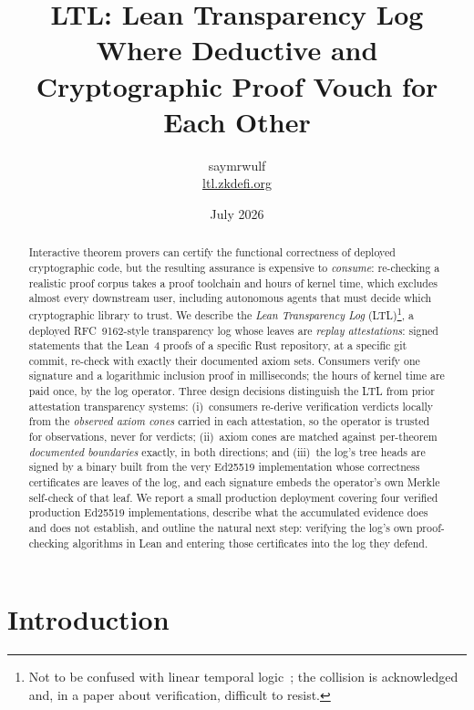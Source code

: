 \documentclass[10pt,twocolumn]{article}
\title{\textbf{LTL: Lean Transparency Log}\\[2pt]
\large Where Deductive and Cryptographic Proof Vouch for Each Other}
\author{saymrwulf\\ \small \url{ltl.zkdefi.org}}
\date{July 2026}
\begin{document}
\maketitle

\begin{abstract}
Interactive theorem provers can certify the functional correctness of
deployed cryptographic code, but the resulting assurance is expensive to
\emph{consume}: re-checking a realistic proof corpus takes a proof
toolchain and hours of kernel time, which excludes almost every
downstream user, including autonomous agents that must decide which
cryptographic library to trust. We describe the \emph{Lean Transparency
Log} (LTL)\footnote{Not to be confused with linear temporal
logic~\cite{pnueli77}; the collision is acknowledged and, in a paper
about verification, difficult to resist.}, a deployed RFC~9162-style
transparency log whose leaves are \emph{replay attestations}: signed
statements that the Lean~4 proofs of a specific Rust repository, at a
specific git commit, re-check with exactly their documented axiom sets.
Consumers verify one signature and a logarithmic inclusion proof in
milliseconds; the hours of kernel time are paid once, by the log
operator. Three design decisions distinguish the LTL from prior
attestation transparency systems: (i)~consumers re-derive verification
verdicts locally from the \emph{observed axiom cones} carried in each
attestation, so the operator is trusted for observations, never for
verdicts; (ii)~axiom cones are matched against per-theorem
\emph{documented boundaries} exactly, in both directions; and (iii)~the
log's tree heads are signed by a binary built from the very Ed25519
implementation whose correctness certificates are leaves of the log, and
each signature embeds the operator's own Merkle self-check of that leaf.
We report a small production deployment covering four verified
production Ed25519 implementations, describe what the accumulated
evidence does and does not establish, and outline the natural next step:
verifying the log's own proof-checking algorithms in Lean and entering
those certificates into the log they defend.
\end{abstract}

\section{Introduction}
\label{sec:intro}
\end{document}
